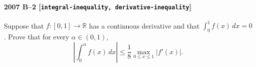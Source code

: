 \paragraph{2007 B--2 \textnormal{[\texttt{integral-inequality, derivative-inequality}]}}
Suppose that $f: [0,1] \to \mathbb{R}$ has a continuous derivative
and that $\int_0^1 f(x)\,dx = 0$. Prove that for every $\alpha \in (0,1)$,
\[
\left| \int_0^\alpha f(x)\,dx \right| \leq \frac{1}{8} \max_{0 \leq x
\leq 1} |f'(x)|.
\]
